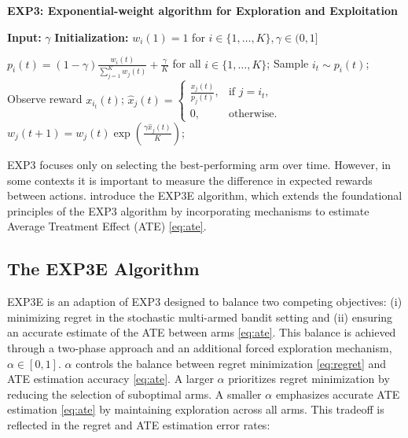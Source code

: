 \begin{algorithm} [H]
\caption{\textbf{EXP3: Exponential-weight algorithm for Exploration and Exploitation}}
\label{alg:EXP3}
\textbf{Input:} \(\gamma\)
\textbf{Initialization:} \( w_i(1) = 1 \) for \( i \in \{1, \dots, K\}, \gamma \in (0,1] \)
\begin{algorithmic}[1]
    \State \( p_i(t) = (1 - \gamma) \frac{w_i(t)}{\sum_{j=1}^{K} w_j(t)} + \frac{\gamma}{K} \) for all \( i \in \{1, \dots, K\} \);
    \State Sample \( i_t \sim p_i(t) \);
    \State Observe reward \( x_{i_t}(t) \);
        \State \( \hat{x}_j(t) =
        \begin{cases} 
            \frac{x_j(t)}{p_j(t)}, & \text{if } j = i_t, \\ 
            0, & \text{otherwise}.
        \end{cases}
        \)
        \State \( w_j(t+1) = w_j(t) \exp\left( \frac{\gamma \hat{x}_j(t)}{K} \right) \);
    \EndFor
\EndFor
\end{algorithmic}
\end{algorithm}

EXP3 focuses only on selecting the best-performing arm over time. However, in some contexts it is important to measure the difference in expected rewards between actions. \cite{simchilevi2023adaptive} introduce the EXP3E algorithm, which extends the foundational principles of the EXP3 algorithm by incorporating mechanisms to estimate Average Treatment Effect (ATE) \ref{eq:ate}.

\subsection{The EXP3E Algorithm}\label{subsec:exp3e}

EXP3E is an adaption of EXP3 designed to balance two competing objectives: (i) minimizing regret in the stochastic multi-armed bandit setting and (ii) ensuring an accurate estimate of the ATE between arms \ref{eq:ate}. This balance is achieved through a two-phase approach and an additional forced exploration mechanism, \(\alpha \in [0,1].\) \(\alpha\) controls the balance between regret minimization  \ref{eq:regret} and ATE estimation accuracy  \ref{eq:ate}. A larger \(\alpha\) prioritizes regret minimization by reducing the selection of suboptimal arms. A smaller \(\alpha\) emphasizes accurate ATE estimation \ref{eq:ate} by maintaining exploration across all arms.
This tradeoff is reflected in the regret and ATE estimation error rates:

